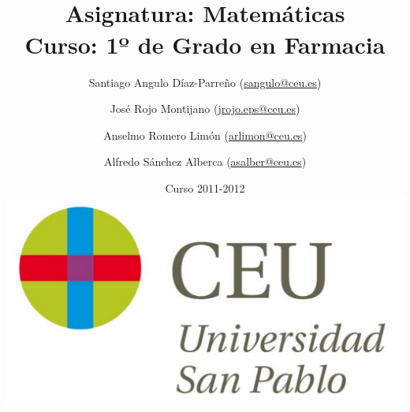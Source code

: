 \documentclass[a4paper,titlepage]{article}
\begin{document}
\sloppy

\title{\vskip 2cm
\shadowbox{\Huge \textbf{\textsf{\quad \textcolor[rgb]{0.00,0.00,0.50}{EJERCICIOS DE CÁLCULO}\quad}}}\\
   \vskip 1cm
   {\Large \textsf{\textcolor[rgb]{0.50,0.00,0.25}{Asignatura: Matemáticas }}}\\
   {\Large \textsf{\textcolor[rgb]{0.50,0.00,0.25}{Curso: 1º de Grado en Farmacia}}}
   }
\author{
   Santiago Angulo Díaz-Parreño (\url{sangulo@ceu.es})
   \and
   José Rojo Montijano (\url{jrojo.eps@ceu.es})
   \and
   Anselmo Romero Limón (\url{arlimon@ceu.es})
   \and
   Alfredo Sánchez Alberca (\url{asalber@ceu.es})
}
\date{Curso 2011-2012\\[1cm]
\includegraphics[scale=0.3]{img/logo_uspceu_01}}

\maketitle
\tableofcontents
\newpage








%
%
%




\end{document}
